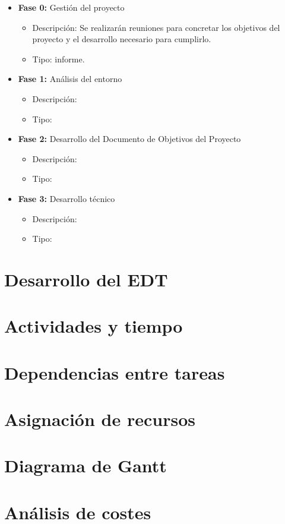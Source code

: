 \begin{itemize}
  \item \textbf{Fase 0:} Gestión del proyecto
  \begin{itemize}
    \item Descripción: Se realizarán reuniones para concretar los objetivos del proyecto y el desarrollo necesario para 
    cumplirlo.
    \item Tipo: informe.
  \end{itemize}
  \item \textbf{Fase 1:} Análisis del entorno
  \begin{itemize}
    \item Descripción: 
    \item Tipo: 
  \end{itemize}
  \item \textbf{Fase 2:} Desarrollo del Documento de Objetivos del Proyecto
  \begin{itemize}
    \item Descripción: 
    \item Tipo: 
  \end{itemize}
  \item \textbf{Fase 3:} Desarrollo técnico
  \begin{itemize}
    \item Descripción: 
    \item Tipo: 
  \end{itemize}
\end{itemize}

\section{Desarrollo del EDT}

\section{Actividades y tiempo}

\section{Dependencias entre tareas}

\section{Asignación de recursos}

\section{Diagrama de Gantt}

\section{Análisis de costes}
